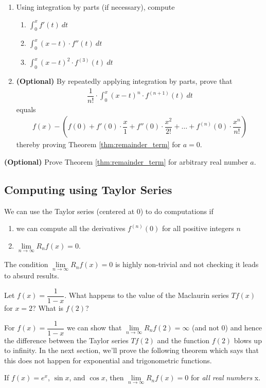\begin{exercise}
  \begin{enumerate}
    \item Using integration by parts (if necessary), compute
    \begin{enumerate}
      \item $\int_0^x {f'(t)} \: dt$
      \item $\int_0^x (x-t) \cdot {f''(t)} \: dt$
      \item $\int_0^x (x-t)^2 \cdot {f^{(3)}(t)} \: dt$
    \end{enumerate}
    \item{\bf (Optional)} By repeatedly applying integration by parts, prove that
    \begin{align*}
      \dfrac{1}{n!} \cdot \int_0^x {(x-t)^n \cdot {f^{(n+1)}(t)}} \: dt
    \end{align*}
    equals
    \begin{align*}
      f(x) - \left( f(0)
      + f'(0) \cdot \dfrac{x}{1}
      + f''(0) \cdot \dfrac{x^2}{2!}
      + \dots
      + f^{(n)}(0) \cdot \dfrac{x^n}{n!}
      \right)
    \end{align*}
    thereby proving Theorem \ref{thm:remainder_term} for $a=0$.
  \end{enumerate}
\end{exercise}

\begin{exercise}{\bf (Optional)}
  Prove Theorem \ref{thm:remainder_term} for arbitrary real number $a$.
\end{exercise}


\newpage
\subsection{Computing using Taylor Series}
We can use the Taylor series (centered at 0) to do computations if
\begin{enumerate}
  \item we can compute all the derivatives $f^{(n)}(0)$ for all positive integers $n$
  \item $ \lim \limits_{n \rightarrow \infty}R_n f(x) = 0$.
\end{enumerate}
The condition $ \lim \limits_{n \rightarrow \infty}R_n f(x) = 0$ is highly non-trivial and not checking it leads to absurd results.

\begin{exercise}
  Let $f(x) = \dfrac{1}{1-x}$.
  What happens to the value of the Maclaurin series $Tf(x)$ for $x=2$? What is $f(2)$?
\end{exercise}
For $f(x) = \dfrac{1}{1-x}$ we can show that $ \lim \limits_{n \rightarrow \infty}R_n f(2) = \infty$ (and not 0) and hence the difference between the Taylor series $Tf(2)$ and the function $f(2)$ blows up to infinity.
In the next section, we'll prove the following theorem which says that this does not happen for exponential and trigonometric functions.
\begin{theorem}
  \label{thm:Taylor_series_exponential}
  If $f(x) = e^x$, $\sin x$, and $\cos x$, then $\lim \limits_{n \rightarrow \infty}R_n f(x) = 0$ for \textit{all real numbers} x.
\end{theorem}

